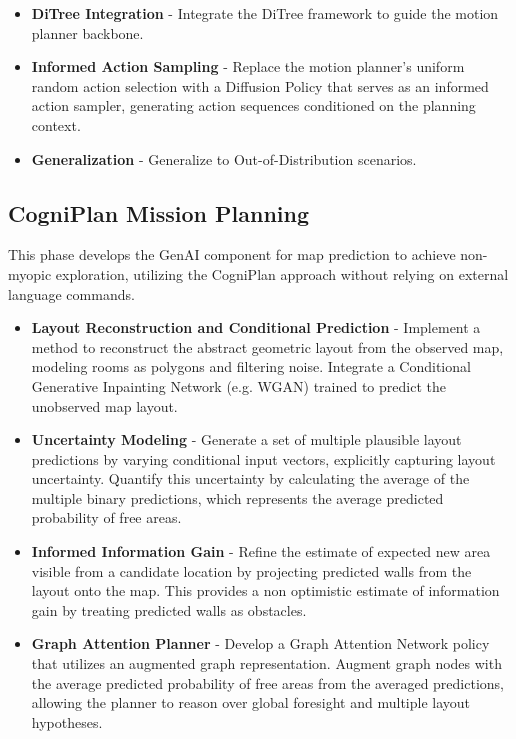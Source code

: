 \documentclass[12pt]{article}
\begin{document}
\begin{itemize}
    \item \textbf{DiTree Integration} - Integrate the DiTree framework to guide the motion planner backbone.
    \item \textbf{Informed Action Sampling} -  Replace the motion planner's uniform random action selection with a Diffusion Policy that serves as an informed action sampler, generating action sequences conditioned on the planning context.
    \item \textbf{Generalization} - Generalize to Out-of-Distribution scenarios.
\end{itemize}


\subsection{CogniPlan Mission Planning}
This phase develops the GenAI component for map prediction to achieve non-myopic exploration, utilizing the CogniPlan approach without relying on external language commands.

\begin{itemize}
    \item \textbf{Layout Reconstruction and Conditional Prediction} - Implement a method to reconstruct the abstract geometric layout from the observed map, modeling rooms as polygons and filtering noise. Integrate a Conditional Generative Inpainting Network (e.g. WGAN) trained to predict the unobserved map layout.
    \item \textbf{Uncertainty Modeling} - Generate a set of multiple plausible layout predictions by varying conditional input vectors, explicitly capturing layout uncertainty. Quantify this uncertainty by calculating the average of the multiple binary predictions, which represents the average predicted probability of free areas.
    \item \textbf{Informed Information Gain} - Refine the estimate of expected new area visible from a candidate location by projecting predicted walls from the layout onto the map. This provides a non optimistic estimate of information gain by treating predicted walls as obstacles.
    \item  \textbf{Graph Attention Planner} - Develop a Graph Attention Network policy that utilizes an augmented graph representation. Augment graph nodes with the average predicted probability of free areas from the averaged predictions, allowing the planner to reason over global foresight and multiple layout hypotheses.

\end{itemize}
\end{document}
